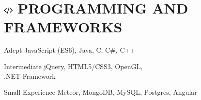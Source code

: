 \documentclass[10pt]{tccv}
\begin{document}
\section{\includegraphics[height=10pt, keepaspectratio=true]{code} PROGRAMMING AND FRAMEWORKS}

\begin{factlist}

\item{Adept}
     {JavaScript (ES6), Java, C, C\#, C++}
     
\item{Intermediate}
	 {jQuery, HTML5/CSS3, OpenGL, \\.NET Framework}

\item{Small Experience}
     {Meteor, MongoDB, MySQL, Postgres, Angular}

\end{factlist}
\end{document}
